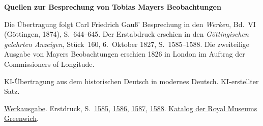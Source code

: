 \clearpage\thispagestyle{empty}
\begin{center}\Large\bfseries Quellen zur Besprechung von Tobias Mayers Beobachtungen\end{center}

Die Übertragung folgt Carl Friedrich Gauß’ Besprechung in den \emph{Werken}, Bd.~VI (Göttingen, 1874), S.~644--645. Der Erstabdruck erschien in den \emph{Göttingischen gelehrten Anzeigen}, Stück~160, 6.~Oktober 1827, S.~1585--1588. Die zweiteilige Ausgabe von Mayers Beobachtungen erschien 1826 in London im Auftrag der Commissioners of Longitude.

KI-Übertragung aus dem historischen Deutsch in modernes Deutsch. KI-erstellter Satz.

\href{https://gdz.sub.uni-goettingen.de/id/PPN236007467}{Werkausgabe}. Erstdruck, S.~\href{https://images.p.sub.uni-goettingen.de/iiif/image/gdz:PPN319721507_1827:00001591/full/1650,/0/default.jpg}{1585}, \href{https://images.p.sub.uni-goettingen.de/iiif/image/gdz:PPN319721507_1827:00001592/full/1650,/0/default.jpg}{1586}, \href{https://images.p.sub.uni-goettingen.de/iiif/image/gdz:PPN319721507_1827:00001593/full/1650,/0/default.jpg}{1587}, \href{https://images.p.sub.uni-goettingen.de/iiif/image/gdz:PPN319721507_1827:00001594/full/1650,/0/default.jpg}{1588}. \href{https://www.rmg.co.uk/collections/library/rmgl-119678}{Katalog der Royal Museums Greenwich}.

\clearpage
